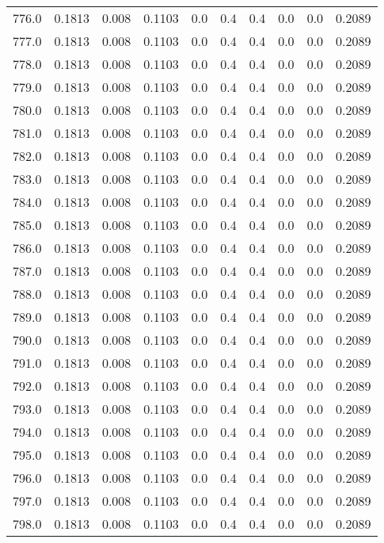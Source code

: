 \begin{longtable}{lrrrrrrrrr}
776.0 & 0.1813 & 0.008 & 0.1103 & 0.0 & 0.4 & 0.4 & 0.0 & 0.0 & 0.2089 \\
777.0 & 0.1813 & 0.008 & 0.1103 & 0.0 & 0.4 & 0.4 & 0.0 & 0.0 & 0.2089 \\
778.0 & 0.1813 & 0.008 & 0.1103 & 0.0 & 0.4 & 0.4 & 0.0 & 0.0 & 0.2089 \\
779.0 & 0.1813 & 0.008 & 0.1103 & 0.0 & 0.4 & 0.4 & 0.0 & 0.0 & 0.2089 \\
780.0 & 0.1813 & 0.008 & 0.1103 & 0.0 & 0.4 & 0.4 & 0.0 & 0.0 & 0.2089 \\
781.0 & 0.1813 & 0.008 & 0.1103 & 0.0 & 0.4 & 0.4 & 0.0 & 0.0 & 0.2089 \\
782.0 & 0.1813 & 0.008 & 0.1103 & 0.0 & 0.4 & 0.4 & 0.0 & 0.0 & 0.2089 \\
783.0 & 0.1813 & 0.008 & 0.1103 & 0.0 & 0.4 & 0.4 & 0.0 & 0.0 & 0.2089 \\
784.0 & 0.1813 & 0.008 & 0.1103 & 0.0 & 0.4 & 0.4 & 0.0 & 0.0 & 0.2089 \\
785.0 & 0.1813 & 0.008 & 0.1103 & 0.0 & 0.4 & 0.4 & 0.0 & 0.0 & 0.2089 \\
786.0 & 0.1813 & 0.008 & 0.1103 & 0.0 & 0.4 & 0.4 & 0.0 & 0.0 & 0.2089 \\
787.0 & 0.1813 & 0.008 & 0.1103 & 0.0 & 0.4 & 0.4 & 0.0 & 0.0 & 0.2089 \\
788.0 & 0.1813 & 0.008 & 0.1103 & 0.0 & 0.4 & 0.4 & 0.0 & 0.0 & 0.2089 \\
789.0 & 0.1813 & 0.008 & 0.1103 & 0.0 & 0.4 & 0.4 & 0.0 & 0.0 & 0.2089 \\
790.0 & 0.1813 & 0.008 & 0.1103 & 0.0 & 0.4 & 0.4 & 0.0 & 0.0 & 0.2089 \\
791.0 & 0.1813 & 0.008 & 0.1103 & 0.0 & 0.4 & 0.4 & 0.0 & 0.0 & 0.2089 \\
792.0 & 0.1813 & 0.008 & 0.1103 & 0.0 & 0.4 & 0.4 & 0.0 & 0.0 & 0.2089 \\
793.0 & 0.1813 & 0.008 & 0.1103 & 0.0 & 0.4 & 0.4 & 0.0 & 0.0 & 0.2089 \\
794.0 & 0.1813 & 0.008 & 0.1103 & 0.0 & 0.4 & 0.4 & 0.0 & 0.0 & 0.2089 \\
795.0 & 0.1813 & 0.008 & 0.1103 & 0.0 & 0.4 & 0.4 & 0.0 & 0.0 & 0.2089 \\
796.0 & 0.1813 & 0.008 & 0.1103 & 0.0 & 0.4 & 0.4 & 0.0 & 0.0 & 0.2089 \\
797.0 & 0.1813 & 0.008 & 0.1103 & 0.0 & 0.4 & 0.4 & 0.0 & 0.0 & 0.2089 \\
798.0 & 0.1813 & 0.008 & 0.1103 & 0.0 & 0.4 & 0.4 & 0.0 & 0.0 & 0.2089 \\

\end{longtable}
